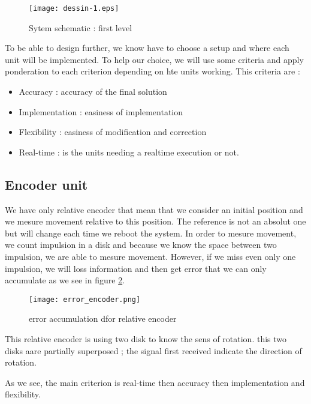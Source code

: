 \begin{figure}[!ht]
\centering
 \texttt{[image: dessin-1.eps]}
 \caption{Sytem schematic : first level}
 \label{sys_sc}
\end{figure}

To be able to design further, we know have to choose a setup and where each unit will be implemented. To help our choice, we will use some criteria and apply ponderation to each criterion depending on hte units working. This criteria are : 
\begin{itemize}
 \item Accuracy : accuracy of the final solution
 \item Implementation : easiness of implementation
 \item Flexibility : easiness of modification and correction
 \item Real-time : is the units needing a realtime execution or not.
\end{itemize}


\subsection{Encoder unit}

We have only relative encoder that mean that we consider an initial position and we mesure movement relative to this position. The reference is not an absolut one but will change each time we reboot the system. In order to mesure movement, we count impulsion in a disk and because we know the space between two impulsion, we are able to mesure movement. However, if we miss even only one impulsion, we will loss information and then get error that we can only accumulate as we see in figure \ref{err_enc}.  

\begin{figure}[!ht]
\centering
 \texttt{[image: error\_encoder.png]}
 \caption{error accumulation dfor relative encoder}
 \label{err_enc}
\end{figure}

This relative encoder is using two disk to know the sens of rotation. this two disks aare partially superposed ; the signal first received indicate the direction of rotation.

As we see, the main criterion is real-time then accuracy then implementation and flexibility.

